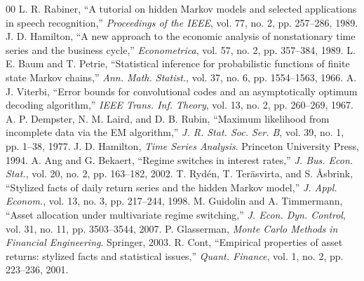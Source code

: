 \documentclass[conference,10pt,twocolumn]{IEEEtran}
\begin{document}
\begin{thebibliography}{00}
 L. R. Rabiner, ``A tutorial on hidden Markov models and selected applications in speech recognition,'' \textit{Proceedings of the IEEE}, vol. 77, no. 2, pp. 257--286, 1989.
 J. D. Hamilton, ``A new approach to the economic analysis of nonstationary time series and the business cycle,'' \textit{Econometrica}, vol. 57, no. 2, pp. 357--384, 1989.
 L. E. Baum and T. Petrie, ``Statistical inference for probabilistic functions of finite state Markov chains,'' \textit{Ann. Math. Statist.}, vol. 37, no. 6, pp. 1554--1563, 1966.
 A. J. Viterbi, ``Error bounds for convolutional codes and an asymptotically optimum decoding algorithm,'' \textit{IEEE Trans. Inf. Theory}, vol. 13, no. 2, pp. 260--269, 1967.
 A. P. Dempster, N. M. Laird, and D. B. Rubin, ``Maximum likelihood from incomplete data via the EM algorithm,'' \textit{J. R. Stat. Soc. Ser. B}, vol. 39, no. 1, pp. 1--38, 1977.
 J. D. Hamilton, \textit{Time Series Analysis}. Princeton University Press, 1994.
 A. Ang and G. Bekaert, ``Regime switches in interest rates,'' \textit{J. Bus. Econ. Stat.}, vol. 20, no. 2, pp. 163--182, 2002.
 T. Rydén, T. Teräsvirta, and S. Åsbrink, ``Stylized facts of daily return series and the hidden Markov model,'' \textit{J. Appl. Econom.}, vol. 13, no. 3, pp. 217--244, 1998.
 M. Guidolin and A. Timmermann, ``Asset allocation under multivariate regime switching,'' \textit{J. Econ. Dyn. Control}, vol. 31, no. 11, pp. 3503--3544, 2007.
 P. Glasserman, \textit{Monte Carlo Methods in Financial Engineering}. Springer, 2003.
 R. Cont, ``Empirical properties of asset returns: stylized facts and statistical issues,'' \textit{Quant. Finance}, vol. 1, no. 2, pp. 223--236, 2001.
\end{thebibliography}
\end{document}
